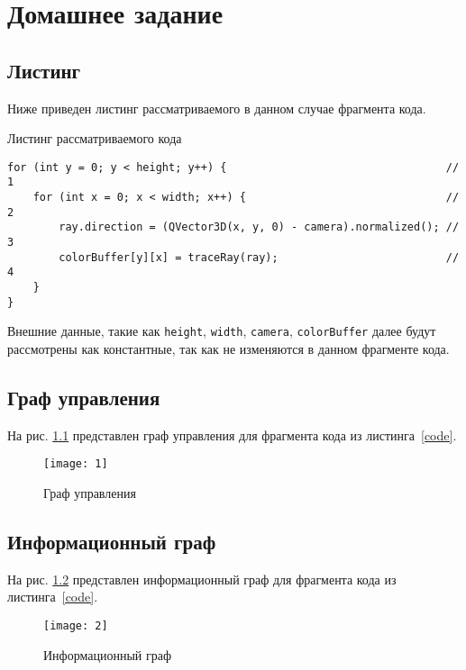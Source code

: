 \chapter{Домашнее задание}

\section{Листинг}

Ниже приведен листинг рассматриваемого в данном случае фрагмента кода.

\begin{code}
\caption{Листинг рассматриваемого кода}
\label{code}
\begin{verbatim}
for (int y = 0; y < height; y++) {                                  // 1
    for (int x = 0; x < width; x++) {                               // 2
        ray.direction = (QVector3D(x, y, 0) - camera).normalized(); // 3
        colorBuffer[y][x] = traceRay(ray);                          // 4
    }
}
\end{verbatim}
\end{code}

Внешние данные, такие как \texttt{height}, \texttt{width}, \texttt{camera}, \texttt{colorBuffer} далее будут рассмотрены как константные, так как не изменяются в данном фрагменте кода.

\section{Граф управления}
На рис. \ref{img:1} представлен граф управления для фрагмента кода из листинга~\ref{code}.

\noindent
\begin{figure}[h!]
	\centering
    \texttt{[image: 1]}
    \caption{Граф управления}
    \label{img:1}
\end{figure}

\newpage

\section{Информационный граф}
На рис. \ref{img:2} представлен информационный граф для фрагмента кода из листинга~\ref{code}.

\noindent
\begin{figure}[h!]
	\centering
    \texttt{[image: 2]}
    \caption{Информационный граф}
    \label{img:2}
\end{figure}

